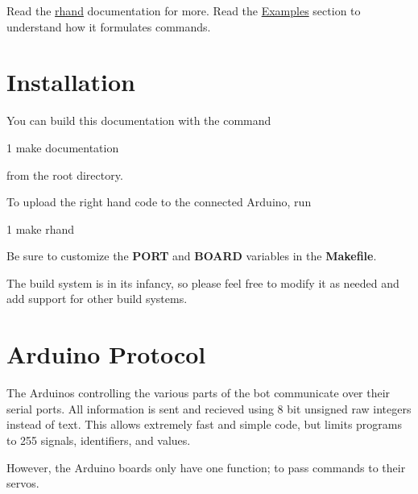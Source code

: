 Read the \hyperlink{namespacerhand}{rhand} documentation for more. Read the \hyperlink{index_Examples}{Examples} section to understand how it formulates commands.\hypertarget{index_Installation}{}\section{Installation}\label{index_Installation}
You can build this documentation with the command 
\begin{DoxyCode}
1 make documentation
\end{DoxyCode}
 from the root directory.

To upload the right hand code to the connected Arduino, run 
\begin{DoxyCode}
1 make rhand
\end{DoxyCode}
 Be sure to customize the {\bfseries P\+O\+R\+T} and {\bfseries B\+O\+A\+R\+D} variables in the {\bfseries Makefile}.

The build system is in its infancy, so please feel free to modify it as needed and add support for other build systems.\hypertarget{index_Arduino}{}\section{Arduino Protocol}\label{index_Arduino}
The Arduinos controlling the various parts of the bot communicate over their serial ports. All information is sent and recieved using 8 bit unsigned raw integers instead of text. This allows extremely fast and simple code, but limits programs to 255 signals, identifiers, and values.

However, the Arduino boards only have one function; to pass commands to their servos.

